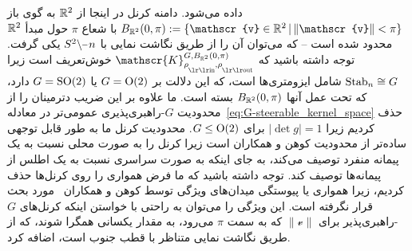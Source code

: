 داده می‌شود. دامنه کرنل در اینجا از $\mathbb{R}^2$ به گوی باز $B_{\R^2}(0,\pi) := \{ \mathscr{v}\in\R^2 \,|\, \lVert \mathscr{v}\rVert < \pi \}$ با شعاع $\pi$ حول مبدأ $\mathbb{R}^2$ محدود شده است -- که می‌توان آن را از طریق نگاشت نمایی با $S^2\backslash \mkern-1mu\minus\mkern1mu n$ یکی گرفت.
توجه داشته باشید که $\mathscr{K}^{G,B_{\R^2}(0,\pi)}_{\rhoin\mkern-1mu,\rhoout}$ خوش‌تعریف است زیرا $\operatorname{Stab}_{n} \cong G$ شامل ایزومتری‌ها است، که این دلالت بر $G=\operatorname{O}(2)$ یا $G=\operatorname{SO}(2)$ دارد، که تحت عمل آنها $B_{\mathbb{R}^2}(0,\pi)$ بسته است.
ما علاوه بر این ضریب دترمینان را از محدودیت $G$-راهبری‌پذیری عمومی‌تر در معادله~\eqref{eq:G-steerable_kernel_space} حذف کردیم زیرا ${|\!\det g| = 1}$ برای $G\leq\operatorname{O}(2)$.
محدودیت کرنل ما به طور قابل توجهی ساده‌تر از محدودیت کوهن و همکاران\cite{Cohen2019-generaltheory} است زیرا کرنل را به صورت محلی نسبت به یک پیمانه منفرد توصیف می‌کند، به جای اینکه به صورت سراسری نسبت به یک اطلس از پیمانه‌ها توصیف کند.
توجه داشته باشید که ما فرض همواری را روی کرنل‌ها حذف کردیم، زیرا همواری یا پیوستگی میدان‌های ویژگی توسط کوهن و همکاران~\cite{Cohen2019-generaltheory} مورد بحث قرار نگرفته است.
این ویژگی را می‌توان به راحتی با خواستن اینکه کرنل‌های $G$-راهبری‌پذیر برای $\lVert\mathscr{v}\rVert$ که به سمت $\pi$ می‌رود، به مقدار یکسانی همگرا شوند، که از طریق نگاشت نمایی متناظر با قطب جنوب است، اضافه کرد.

